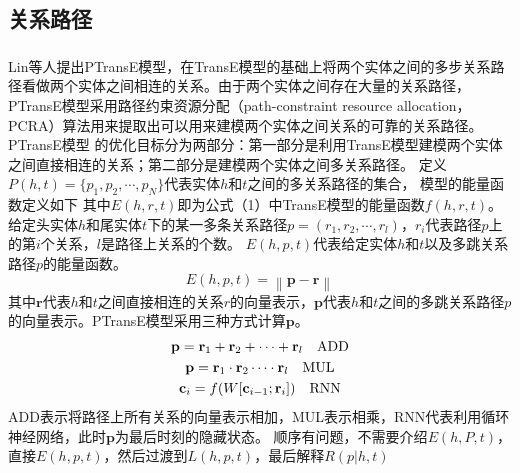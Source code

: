 \documentclass[twocolumn]{article}
\newcommand{\upcite}[1]{\textsuperscript{\textsuperscript{\cite{#1}}}}
\begin{document}
\subsection{关系路径}


Lin等人\upcite{PTransE}提出PTransE模型，在TransE模型的基础上将两个实体之间的多步关系路径看做两个实体之间相连的关系。由于两个实体之间存在大量的关系路径，PTransE模型采用路径约束资源分配（path-constraint resource allocation，PCRA）算法用来提取出可以用来建模两个实体之间关系的可靠的关系路径。PTransE模型
的优化目标分为两部分：第一部分是利用TransE模型建模两个实体之间直接相连的关系；第二部分是建模两个实体之间多关系路径。
定义$P(h,t)=\{p_1,p_2,\cdots,p_N\}$代表实体$h$和$t$之间的多关系路径的集合，
模型的能量函数定义如下
其中$E(h,r,t)$即为公式（1）中TransE模型的能量函数$f(h,r,t)$。
给定头实体$h$和尾实体$t$下的某一多条关系路径$p=(r_1,r_2,\cdots,r_l)$，$r_i$代表路径$p$上的第$i$个关系，$l$是路径上关系的个数。
$E(h,p,t)$代表给定实体$h$和$t$以及多跳关系路径$p$的能量函数。
\begin{equation}
	E(h,p,t)=\left \| \textbf{p}-\textbf{r} \right \|
\end{equation}
其中$\textbf{r}$代表$h$和$t$之间直接相连的关系$r$的向量表示，$\textbf{p}$代表$h$和$t$之间的多跳关系路径$p$的向量表示。PTransE模型采用三种方式计算$\textbf{p}$。
\begin{gather}
	\textbf{p}=\textbf{r}_1+\textbf{r}_2+\cdots+\textbf{r}_l \quad \text{ADD}\notag \\
	\textbf{p}=\textbf{r}_1\cdot\textbf{r}_2\cdots\cdot\textbf{r}_l \quad \text{MUL}\notag \\
	\textbf{c}_i=f(W[\textbf{c}_{i-1};\textbf{r}_i]) \quad \text{RNN} \notag
\end{gather}
ADD表示将路径上所有关系的向量表示相加，MUL表示相乘，RNN代表利用循环神经网络，此时$\textbf{p}$为最后时刻的隐藏状态。
顺序有问题，不需要介绍$E(h,P,t)$，直接$E(h,p,t)$，然后过渡到$L(h,p,t)$，最后解释$R(p|h,t)$



\printbibliography
\end{document}
